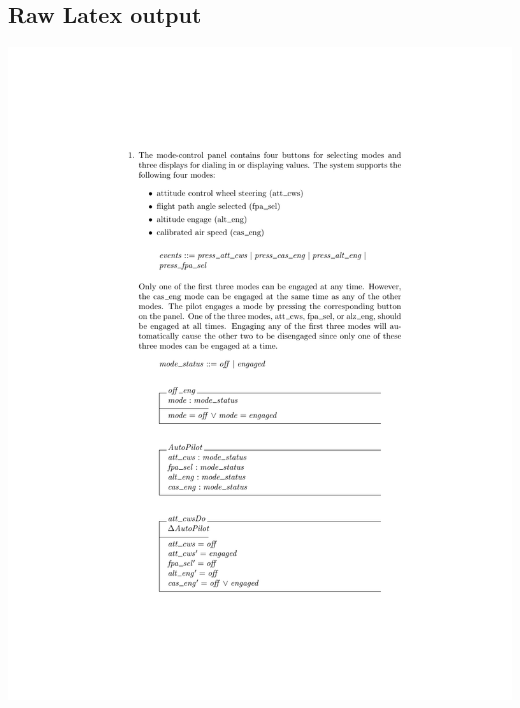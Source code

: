\subsection{Raw Latex output}
\noindent \includegraphics[clip, trim=4cm 4cm 4cm 4.2cm, scale=0.9]{examples/semiform/0.pdf}

